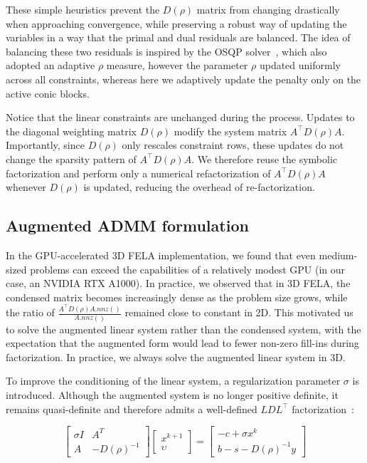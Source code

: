 These simple heuristics prevent the $D(\rho)$ matrix from changing drastically when approaching convergence, while preserving a robust way of updating the variables in a way that the primal and dual residuals are balanced. The idea of balancing these two residuals is inspired by the OSQP solver~\cite{OSQP}, which also adopted an adaptive $\rho$ measure, however the parameter $\rho$ updated uniformly across all constraints, whereas here we adaptively update the penalty only on the active conic blocks.

Notice that the linear constraints are unchanged during the process. Updates to the diagonal weighting matrix $D(\rho)$ modify the system matrix $A^\top D(\rho) A$. Importantly, since $D(\rho)$ only rescales constraint rows, these updates do not change the sparsity pattern of $A^\top D(\rho) A$. We therefore reuse the symbolic factorization and perform only a numerical refactorization of $A^\top D(\rho) A$ whenever $D(\rho)$ is updated, reducing the overhead of re-factorization.




\subsection{Augmented ADMM formulation}

In the GPU-accelerated 3D FELA implementation, we found that even medium-sized problems can exceed the capabilities of a relatively modest GPU (in our case, an NVIDIA RTX A1000). In practice, we observed that in 3D FELA, the condensed matrix becomes increasingly dense as the problem size grows, while the ratio of $\frac{A^\top D(\rho) A.nnz()}{A.nnz()}$ remained close to constant in 2D. This motivated us to solve the augmented linear system rather than the condensed system, with the expectation that the augmented form would lead to fewer non-zero fill-ins during factorization. In practice, we always solve the augmented linear system in 3D.

To improve the conditioning of the linear system, a regularization parameter \(\sigma\) is introduced. Although the augmented system is no longer positive definite, it remains quasi-definite and therefore admits a well-defined \(LDL^\top\) factorization~\cite{COSMO}:

\begin{equation}
\begin{bmatrix}
\sigma I & A^{T} \\
A & -D(\rho)^{-1}
\end{bmatrix}
\begin{bmatrix}
x^{k+1} \\
\upsilon
\end{bmatrix}
=
\begin{bmatrix}
-c + \sigma x^{k} \\
b - s - D(\rho)^{-1} y
\end{bmatrix}
\label{eq:AUG}
\end{equation}

